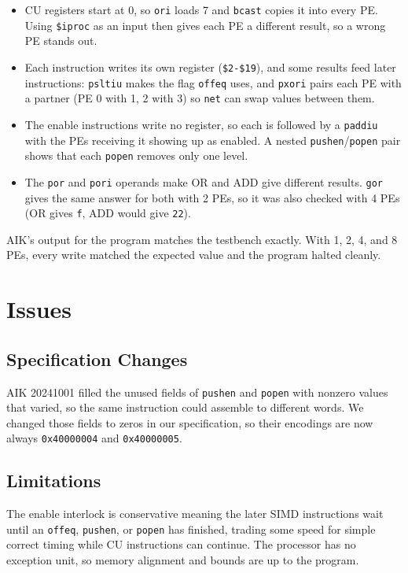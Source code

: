 \documentclass[sigconf,nonacm]{acmart}
\begin{document}
\begin{itemize}
        \item CU registers start at 0, so \texttt{ori} loads 7 and \texttt{bcast} copies it into every PE. Using \texttt{\$iproc} as an input then gives each PE a different result, so a wrong PE stands out.
        \item Each instruction writes its own register (\texttt{\$2-\$19}), and some results feed later instructions: \texttt{psltiu} makes the flag \texttt{offeq} uses, and \texttt{pxori} pairs each PE with a partner (PE 0 with 1, 2 with 3) so \texttt{net} can swap values between them.
        \item The enable instructions write no register, so each is followed by a \texttt{paddiu} with the PEs receiving it showing up as enabled. A nested \texttt{pushen}/\texttt{popen} pair shows that each \texttt{popen} removes only one level.
        \item The \texttt{por} and \texttt{pori} operands make OR and ADD give different results. \texttt{gor} gives the same answer for both with 2 PEs, so it was also checked with 4 PEs (OR gives \texttt{f}, ADD would give \texttt{22}).
\end{itemize}

\noindent AIK's output for the program matches the testbench exactly. With 1, 2, 4, and 8 PEs, every write matched the expected value and the program halted cleanly.


\section{Issues}

\subsection{Specification Changes}
AIK 20241001 filled the unused fields of \texttt{pushen} and \texttt{popen} with nonzero values that varied, so the same instruction could assemble to different words. We changed those fields to zeros in our specification, so their encodings are now always \texttt{0x40000004} and \texttt{0x40000005}.

\subsection{Limitations}
The enable interlock is conservative meaning the later SIMD instructions wait until an \texttt{offeq}, \texttt{pushen}, or \texttt{popen} has finished, trading some speed for simple correct timing while CU instructions can continue. The processor has no exception unit, so memory alignment and bounds are up to the program.
\end{document}
